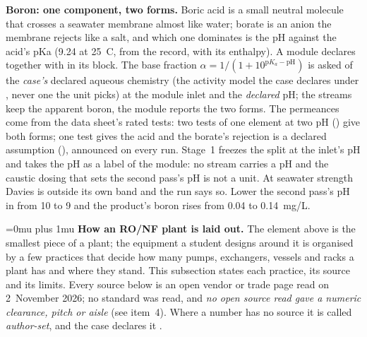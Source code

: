 \documentclass[11pt,a4paper]{article}
\begin{document}
\medskip\noindent\textbf{Boron: one component, two forms.}  Boric acid is a
small neutral molecule that crosses a seawater membrane almost like water;
borate is an anion the membrane rejects like a salt, and which one dominates is
the pH against the acid's pKa (9.24 at 25~\textdegree{}C, from the
 record, with its enthalpy).  A module
declares  together with
 in its  block.  The base
fraction $\alpha=1/(1+10^{\mathrm{p}K_a-\mathrm{pH}})$ is asked of the
\emph{case's} declared aqueous chemistry (the activity model the case declares
under , never one the unit picks) at the module
inlet and the \emph{declared} pH; the streams keep the apparent boron, the
module reports the two forms.  The permeances come from the data sheet's rated
tests: two tests of one element at two pH () give both
forms; one test gives the acid and the borate's rejection is a declared
assumption (), announced on every run.  Stage~1
freezes the split at the inlet's pH and takes the pH as a label of the module:
no stream carries a pH and the caustic dosing that sets the second pass's pH is
not a unit.  At seawater strength Davies is outside its own band and the run
says so.  Lower the second pass's pH in
 from 10 to 9 and the product's boron rises from
0.04 to 0.14~mg/L.

\begingroup\Urlmuskip=0mu plus 1mu\relax
\medskip\noindent\textbf{How an RO/NF plant is laid out.}  The element above
is the smallest piece of a plant; the equipment a student designs around
it is organised by a few practices that decide how many pumps, exchangers,
vessels and racks a plant has and where they stand.  This subsection states
each practice, its source and its limits.  Every source below is an open
vendor or trade page read on 2~November 2026; no standard was read, and
\emph{no open source read gave a numeric clearance, pitch or aisle} (see
item~4).  Where a number has no source it is called \emph{author-set}, and
the case declares it .
\end{document}

